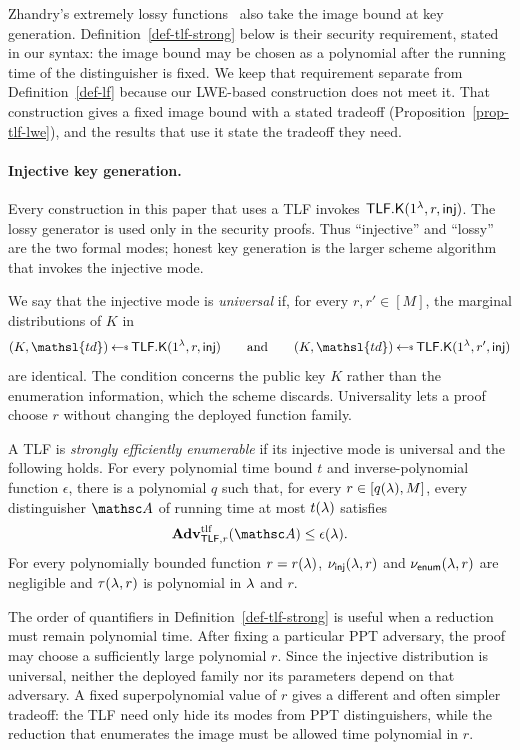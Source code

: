 Zhandry's extremely lossy functions~\cite{C:Zhandry16,EPRINT:Zhandry16} also take
the image bound at key generation. Definition~\ref{def-tlf-strong} below is their
security requirement, stated in our syntax: the image bound may be chosen as a
polynomial after the running time of the distinguisher is fixed. We keep that
requirement separate from Definition~\ref{def-lf} because our LWE-based
construction does not meet it. That construction gives a fixed image bound with a
stated tradeoff (Proposition~\ref{prop-tlf-lwe}), and the results that use it
state the tradeoff they need.

\paragraph*{Injective key generation.}
Every construction in this paper that uses a TLF invokes
$\mathsf{TLF}.\mathsf{K}(1^{\lambda},r,\mathsf{inj})$. The lossy generator is used only in the
security proofs. Thus ``injective'' and ``lossy'' are the two formal modes;
honest key generation is the larger scheme algorithm that invokes the
injective mode.

We say that the injective mode is \emph{universal} if, for every $r,r'\in[M]$,
the marginal distributions of $K$ in
$$
(K,\mathsl{td})\getsr\TLFKg(\usecp,r,\mathsf{inj})
\qquad\text{and}\qquad
(K,\mathsl{td})\getsr\TLFKg(\usecp,r',\mathsf{inj})
$$
are identical. The condition concerns the public key $K$ rather than the
enumeration information, which the scheme discards. Universality lets a proof
choose $r$ without changing the deployed function family.

\begin{definition} \label{def-tlf-strong}
A TLF is \emph{strongly efficiently enumerable} if its injective mode is
universal and the following holds. For every polynomial time bound $t$ and
inverse-polynomial function $\epsilon$, there is a polynomial $q$ such that,
for every $r\in[q(\lambda),M]$, every distinguisher $\advA$ of running time at
most $t(\lambda)$ satisfies
$$
\AdvTLF{\TLF,r}{\advA}\le\epsilon(\secp).
$$
For every polynomially bounded function $r=r(\lambda)$,
$\nu_{\mathsf{inj}}(\lambda,r)$ and
$\nu_{\mathsf{enum}}(\lambda,r)$ are negligible and
$\tau(\lambda,r)$ is polynomial in $\lambda$ and $r$.
\end{definition}

The order of quantifiers in Definition~\ref{def-tlf-strong} is useful when a
reduction must remain polynomial time. After fixing a particular PPT
adversary, the proof may choose a sufficiently large polynomial $r$. Since
the injective distribution is universal, neither the deployed family nor its
parameters depend on that adversary. A fixed superpolynomial value of $r$
gives a different and often simpler tradeoff: the TLF need only hide its modes
from PPT distinguishers, while the reduction that enumerates the image must
be allowed time polynomial in $r$.

